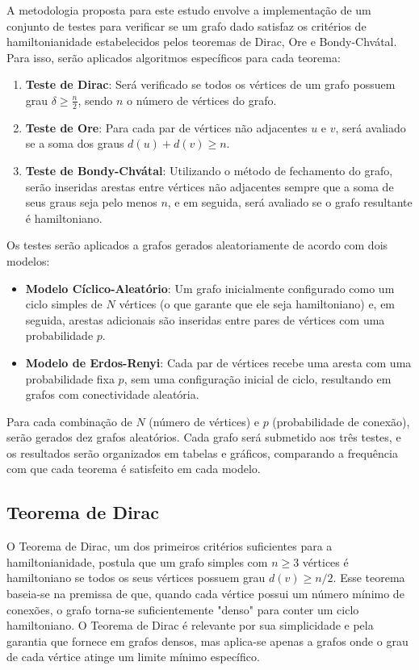 \documentclass[12pt, openright, oneside, a4paper, chapter=TITLE, section=TITLE, subsection=TITLE, subsubsection=TITLE, brazil]{abntex2}
\begin{document}
\hspace{1.25cm}A metodologia proposta para este estudo envolve a implementação de um conjunto de testes para verificar se um grafo dado satisfaz os critérios de hamiltonianidade estabelecidos pelos teoremas de Dirac, Ore e Bondy-Chvátal. Para isso, serão aplicados algoritmos específicos para cada teorema:
\begin{enumerate}
    \item \textbf{Teste de Dirac}: Será verificado se todos os vértices de um grafo possuem grau $\delta \geq \frac{n}{2}$, sendo $n$ o número de vértices do grafo.
    \item \textbf{Teste de Ore}: Para cada par de vértices não adjacentes $u$ e $v$, será avaliado se a soma dos graus $d(u) + d(v) \geq n$.
    \item \textbf{Teste de Bondy-Chvátal}: Utilizando o método de fechamento do grafo, serão inseridas arestas entre vértices não adjacentes sempre que a soma de seus graus seja pelo menos $n$, e em seguida, será avaliado se o grafo resultante é hamiltoniano.
\end{enumerate}
Os testes serão aplicados a grafos gerados aleatoriamente de acordo com dois modelos:
\begin{itemize}
    \item \textbf{Modelo Cíclico-Aleatório}: Um grafo inicialmente configurado como um ciclo simples de $N$ vértices (o que garante que ele seja hamiltoniano) e, em seguida, arestas adicionais são inseridas entre pares de vértices com uma probabilidade $p$.
    \item \textbf{Modelo de Erdos-Renyi}: Cada par de vértices recebe uma aresta com uma probabilidade fixa $p$, sem uma configuração inicial de ciclo, resultando em grafos com conectividade aleatória.
\end{itemize}
\hspace{1.25cm}Para cada combinação de $N$ (número de vértices) e $p$ (probabilidade de conexão), serão gerados dez grafos aleatórios. Cada grafo será submetido aos três testes, e os resultados serão organizados em tabelas e gráficos, comparando a frequência com que cada teorema é satisfeito em cada modelo.

\subsection{Teorema de Dirac}
\hspace{1.25cm}O Teorema de Dirac, um dos primeiros critérios suficientes para a hamiltonianidade, postula que um grafo simples com $n \geq 3$ vértices é hamiltoniano se todos os seus vértices possuem grau $d(v) \geq n/2$. Esse teorema baseia-se na premissa de que, quando cada vértice possui um número mínimo de conexões, o grafo torna-se suficientemente "denso" para conter um ciclo hamiltoniano. O Teorema de Dirac é relevante por sua simplicidade e pela garantia que fornece em grafos densos, mas aplica-se apenas a grafos onde o grau de cada vértice atinge um limite mínimo específico.
\end{document}
